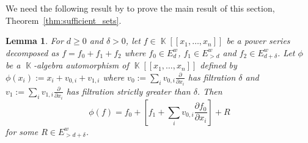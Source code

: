 \documentclass[noend]{amsproc}
\newtheorem{lemma}[theorem]{Lemma}
\theoremstyle{definition}
\DeclareMathOperator{\K}{\mathbb{K}}
\begin{document}
We need the following result by \citet{A1974} to prove the main result of this
section, Theorem~\ref{thm:sufficient_sets}.

\begin{lemma}\label{vectorlemma}
For $d \geq 0$ and $\delta > 0$, let $f \in \K[[x_1,\ldots,x_n]]$ be a power
series decomposed as $f = f_0+f_1+f_2$ where $f_0 \in E^w_d$,
$f_1 \in E^w_{>d}$ and $f_2 \in E^w_{d+\delta}$. Let
$\phi$ be a $\K$-algebra automorphism of $\K[[x_1,\ldots,x_n]]$ defined by
$\phi(x_i) := x_i+v_{0,i}+v_{1,i}$ where
$v_0 := \sum_iv_{0,i}\frac{\partial}{\partial x_i}$ has filtration $\delta$ and
$v_1 := \sum_iv_{1,i}\frac{\partial}{\partial x_i}$ has filtration strictly
greater than $\delta$. Then
\[
\phi(f)
= f_0 + \left[f_1 + \sum_i v_{0,i}\frac{\partial f_0}{\partial x_i}\right] + R
\]
for some $R\in E^w_{>d+\delta}$.
\end{lemma}
\end{document}
